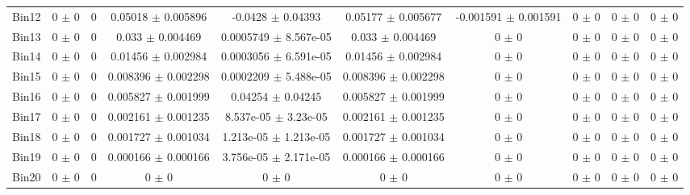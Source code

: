 \begin{tabular}{@{\extracolsep{4pt}}lccccccccc@{}}
     Bin12 & 0 $\pm$ 0 & 0 & 0.05018 $\pm$ 0.005896 & -0.0428 $\pm$ 0.04393 & 0.05177 $\pm$ 0.005677 & -0.001591 $\pm$ 0.001591 & 0 $\pm$ 0 & 0 $\pm$ 0 & 0 $\pm$ 0 \\ 
     Bin13 & 0 $\pm$ 0 & 0 & 0.033 $\pm$ 0.004469 & 0.0005749 $\pm$ 8.567e-05 & 0.033 $\pm$ 0.004469 & 0 $\pm$ 0 & 0 $\pm$ 0 & 0 $\pm$ 0 & 0 $\pm$ 0 \\ 
     Bin14 & 0 $\pm$ 0 & 0 & 0.01456 $\pm$ 0.002984 & 0.0003056 $\pm$ 6.591e-05 & 0.01456 $\pm$ 0.002984 & 0 $\pm$ 0 & 0 $\pm$ 0 & 0 $\pm$ 0 & 0 $\pm$ 0 \\ 
     Bin15 & 0 $\pm$ 0 & 0 & 0.008396 $\pm$ 0.002298 & 0.0002209 $\pm$ 5.488e-05 & 0.008396 $\pm$ 0.002298 & 0 $\pm$ 0 & 0 $\pm$ 0 & 0 $\pm$ 0 & 0 $\pm$ 0 \\ 
     Bin16 & 0 $\pm$ 0 & 0 & 0.005827 $\pm$ 0.001999 & 0.04254 $\pm$ 0.04245 & 0.005827 $\pm$ 0.001999 & 0 $\pm$ 0 & 0 $\pm$ 0 & 0 $\pm$ 0 & 0 $\pm$ 0 \\ 
     Bin17 & 0 $\pm$ 0 & 0 & 0.002161 $\pm$ 0.001235 & 8.537e-05 $\pm$ 3.23e-05 & 0.002161 $\pm$ 0.001235 & 0 $\pm$ 0 & 0 $\pm$ 0 & 0 $\pm$ 0 & 0 $\pm$ 0 \\ 
     Bin18 & 0 $\pm$ 0 & 0 & 0.001727 $\pm$ 0.001034 & 1.213e-05 $\pm$ 1.213e-05 & 0.001727 $\pm$ 0.001034 & 0 $\pm$ 0 & 0 $\pm$ 0 & 0 $\pm$ 0 & 0 $\pm$ 0 \\ 
     Bin19 & 0 $\pm$ 0 & 0 & 0.000166 $\pm$ 0.000166 & 3.756e-05 $\pm$ 2.171e-05 & 0.000166 $\pm$ 0.000166 & 0 $\pm$ 0 & 0 $\pm$ 0 & 0 $\pm$ 0 & 0 $\pm$ 0 \\ 
     Bin20 & 0 $\pm$ 0 & 0 & 0 $\pm$ 0 & 0 $\pm$ 0 & 0 $\pm$ 0 & 0 $\pm$ 0 & 0 $\pm$ 0 & 0 $\pm$ 0 & 0 $\pm$ 0 \\ 
\hline\hline
  \end{tabular}
